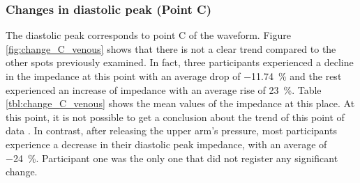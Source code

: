 \subsubsection{Changes in diastolic peak (Point C)}
\label{section results 3.1.3}
The diastolic peak corresponds to point C of the waveform. Figure \ref{fig:change_C_venous} shows that there is not a clear trend compared to the other spots previously examined. In fact, three participants experienced a decline in the impedance at this point with an average drop of \SI{-11.74}{\percent} and the rest experienced an increase of impedance with an average rise of \SI{23}{\percent}. Table \ref{tbl:change_C_venous} shows the mean values of the impedance at this place. At this point, it is not possible to get a conclusion about the trend of this point of data . In contrast, after releasing the upper arm's pressure, most participants experience a decrease in their diastolic peak impedance, with an average of \SI{-24}{\percent}. Participant one was the only one that did not register any significant change. 

